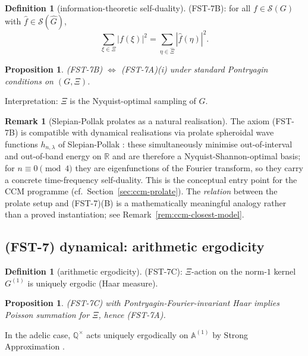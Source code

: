 \documentclass[11pt,a4paper]{article}
\theoremstyle{plain}
\newtheorem{proposition}[theorem]{Proposition}
\theoremstyle{definition}
\newtheorem{definition}[theorem]{Definition}
\newtheorem{remark}[theorem]{Remark}
\newcommand{\R}{\mathbb{R}}
\newcommand{\Q}{\mathbb{Q}}
\newcommand{\A}{\mathbb{A}}
\renewcommand{\S}{\mathcal{S}}
\begin{document}
\begin{definition}[information-theoretic self-duality]
\label{def:fst7-b}
(FST-7B): for all $f \in \S(G)$ with $\hat f \in \S(\hat G)$,
\[
  \sum_{\xi \in \Xi} |f(\xi)|^2 = \sum_{\eta \in \hat\Xi}
    |\hat f(\eta)|^2.
\]
\end{definition}

\begin{proposition}
\label{prop:B-iff-A}
(FST-7B) $\Leftrightarrow$ (FST-7A)(i) under standard Pontryagin
conditions on $(G, \Xi)$.
\end{proposition}

Interpretation: $\Xi$ is the Nyquist-optimal sampling of $G$.

\begin{remark}[Slepian-Pollak prolates as a natural realisation]
\label{rem:b-view-prolate}
The axiom (FST-7B) is compatible with dynamical realisations via
prolate spheroidal wave functions $h_{n,\lambda}$ of Slepian-Pollak
\cite{SlepianPollack1961}: these simultaneously minimise
out-of-interval and out-of-band energy on $\R$ and are therefore a
Nyquist-Shannon-optimal basis; for $n \equiv 0 \pmod 4$ they are
eigenfunctions of the Fourier transform, so they carry a concrete
time-frequency self-duality.  This is the conceptual entry point
for the CCM programme (cf.\ Section~\ref{sec:ccm-prolate}).  The
\emph{relation} between the prolate setup and (FST-7)(B) is a
mathematically meaningful analogy rather than a proved instantiation;
see Remark~\ref{rem:ccm-closest-model}.
\end{remark}

\subsection{(FST-7) dynamical: arithmetic ergodicity}

\begin{definition}[arithmetic ergodicity]
\label{def:fst7-c}
(FST-7C): $\Xi$-action on the norm-$1$ kernel $G^{(1)}$ is uniquely
ergodic (Haar measure).
\end{definition}

\begin{proposition}
\label{prop:C-implies-A}
(FST-7C) with Pontryagin-Fourier-invariant Haar implies
Poisson summation for $\Xi$, hence (FST-7A).
\end{proposition}

In the adelic case, $\Q^\times$ acts uniquely ergodically on
$\A^{(1)}$ by Strong Approximation \cite{CasselsFrohlich}.
\end{document}
